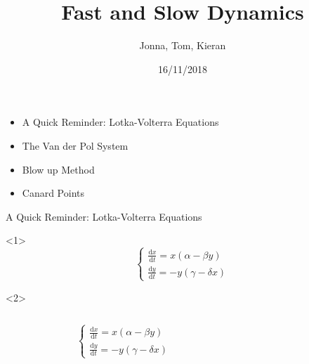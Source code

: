 \documentclass[11pt]{beamer}
\newcommand{\dif}{\mathrm{d}}
\begin{document}
  

\author{Jonna, Tom, Kieran}
\title{Fast and Slow Dynamics}
\date{16/11/2018} 
\frame \titlepage
\begin{frame}
\begin{itemize}
\item A Quick Reminder: Lotka-Volterra Equations
\item The Van der Pol System
\item Blow up Method 
\item Canard Points
\end{itemize}

\end{frame}


\begin{frame}{ A Quick Reminder: Lotka-Volterra Equations}
\begin{onlyenv}<1>
 \[\begin{cases}
 \frac{\dif x}{\dif t}= x(\alpha  - \beta y) \\ \frac{\dif y}{\dif t}= -y( \gamma-\delta x)
 \end{cases}\]
\end{onlyenv}
\begin{onlyenv}<2>
\begin{columns}
\begin{figure}
    \centering
{}
\end{figure}
\[\begin{cases}
 \frac{\dif x}{\dif t}= x(\alpha  - \beta y) \\  \frac{\dif y}{\dif t}= -y( \gamma-\delta x)
 \end{cases}\]
\end{columns}
\end{onlyenv}
\end{frame} 
\end{document}
